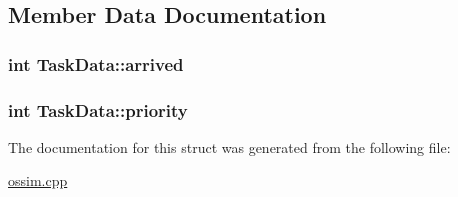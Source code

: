 \subsection{Member Data Documentation}
\hypertarget{struct_task_data_a126fafee3369b6a2d8734f4e46c670bc}{
\subsubsection[{arrived}]{\setlength{\rightskip}{0pt plus 5cm}int Task\+Data\+::arrived}}\label{struct_task_data_a126fafee3369b6a2d8734f4e46c670bc}
\hypertarget{struct_task_data_a9d8b606897eb428a62d816b71312e1b7}{
\subsubsection[{priority}]{\setlength{\rightskip}{0pt plus 5cm}int Task\+Data\+::priority}}\label{struct_task_data_a9d8b606897eb428a62d816b71312e1b7}


The documentation for this struct was generated from the following file\+:\begin{DoxyCompactItemize}
\item 
\hyperlink{ossim_8cpp}{ossim.\+cpp}\end{DoxyCompactItemize}
